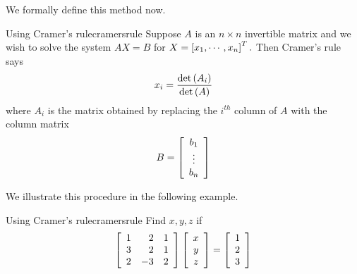 We formally define this method now. 

\begin{procedure}{Using Cramer's rule}{cramersrule}
Suppose $A$ is an $n\times n$ invertible matrix and we wish to solve the system 
$AX=B$ for $X
=\left[ x_{1},\cdots ,x_{n}\right] ^{T}.$ Then Cramer's rule says
\begin{equation*}
x_{i}=
\vspace{0.05in}\frac{\det \left(A_{i}\right)}{\det \left(A\right)}
\end{equation*}
where $A_{i}$ is the matrix obtained by replacing the $i^{th}$ column of $A$
with the column matrix
\begin{equation*}
B = 
\left[
\begin{array}{c}
b_1 \\
\vdots \\
b_n
\end{array}
\right]
\end{equation*} 
\end{procedure}

We illustrate this procedure in the following example.

\begin{example}{Using Cramer's rule}{cramersrule}
Find $x,y,z$ if
\begin{equation*}
\left[
\begin{array}{rrr}
1 & 2 & 1 \\
3 & 2 & 1 \\
2 & -3 & 2
\end{array}
\right] \left[
\begin{array}{c}
x \\
y \\
z
\end{array}
\right] =\left[
\begin{array}{r}
1 \\
2 \\
3
\end{array}
\right] 
\end{equation*}
\end{example}

